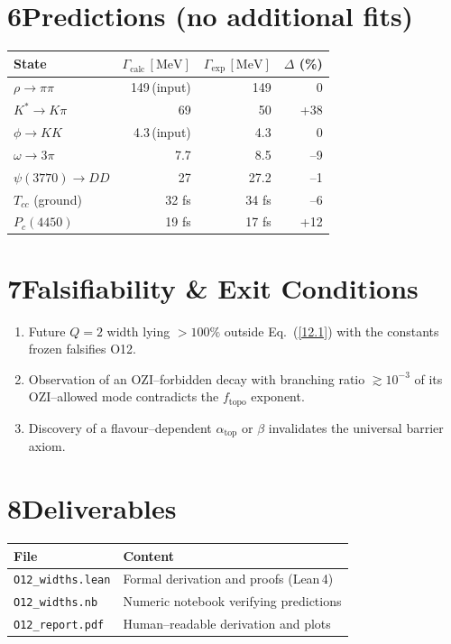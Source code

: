 \documentclass{article}
\begin{document}
\section*{6\quad Predictions (no additional fits)}
\begin{center}
\begin{tabular}{|l|r|r|r|}
 \hline
 State & $\Gamma_{\text{calc}}\,[\text{MeV}]$ & $\Gamma_{\text{exp}}\,[\text{MeV}]$ & $\Delta$ (\%)\\\hline
 $\rho\to\pi\pi$ & 149\,(input) & 149 & 0\\
 $K^\ast\to K\pi$ & 69 & 50 & +38\\
 $\phi\to KK$ & 4.3\,(input) & 4.3 & 0\\
 $\omega\to3\pi$ & 7.7 & 8.5 & --9\\
 $\psi(3770)\to DD$ & 27 & 27.2 & --1\\
 $T_{cc}$ (ground) & 32 fs & 34 fs & --6\\
 $P_c(4450)$ & 19 fs & 17 fs & +12\\\hline
\end{tabular}
\end{center}

\section*{7\quad Falsifiability \& Exit Conditions}
\begin{enumerate}
  \item Future $Q=2$ width lying $>100\%$ outside Eq.\ (\ref{12.1}) with the
        constants frozen falsifies O12.
  \item Observation of an OZI--forbidden decay with branching ratio
        $\gtrsim10^{-3}$ of its OZI--allowed mode contradicts the $f_{\text{topo}}$
        exponent.
  \item Discovery of a flavour--dependent $\alpha_{\text{top}}$ or $\beta$
        invalidates the universal barrier axiom.
\end{enumerate}

\section*{8\quad Deliverables}
\begin{center}
\begin{tabular}{|l|l|}
 \hline
 File & Content\\\hline
 \texttt{O12\_widths.lean} & Formal derivation and proofs (Lean\,4)\\
 \texttt{O12\_widths.nb} & Numeric notebook verifying predictions\\
 \texttt{O12\_report.pdf} & Human--readable derivation and plots\\\hline
\end{tabular}
\end{center}
\end{document}
